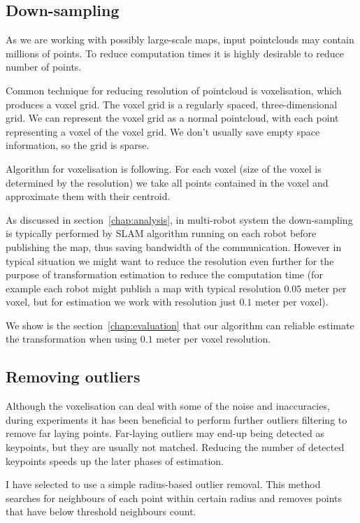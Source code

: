 \subsection{Down-sampling}

As we are working with possibly large-scale maps, input pointclouds may contain millions of points. To reduce computation times it is highly desirable to reduce number of points.

Common technique for reducing resolution of pointcloud is voxelisation, which produces a voxel grid. The voxel grid is a regularly spaced, three-dimensional grid. We can represent the voxel grid as a normal pointcloud, with each point representing a voxel of the voxel grid. We don't usually save empty space information, so the grid is sparse.

Algorithm for voxelisation is following. For each voxel (size of the voxel is determined by the resolution) we take all points contained in the voxel and approximate them with their centroid.

As discussed in section~\ref{chap:analysis}, in multi-robot system the down-sampling is typically performed by \gls{SLAM} algorithm running on each robot before publishing the map, thus saving bandwidth of the communication. However in typical situation we might want to reduce the resolution even further for the purpose of transformation estimation to reduce the computation time (for example each robot might publish a map with typical resolution $0.05$ meter per voxel, but for estimation we work with resolution just $0.1$ meter per voxel).

We show is the section~\ref{chap:evaluation} that our algorithm can reliable estimate the transformation when using $0.1$ meter per voxel resolution.

\subsection{Removing outliers}

Although the voxelisation can deal with some of the noise and inaccuracies, during experiments it has been beneficial to perform further outliers filtering to remove far laying points. Far-laying outliers may end-up being detected as keypoints, but they are usually not matched. Reducing the number of detected keypoints speeds up the later phases of estimation.

I have selected to use a simple radius-based outlier removal. This method searches for neighbours of each point within certain radius and removes points that have below threshold neighbours count.


